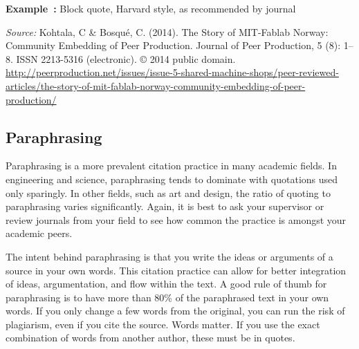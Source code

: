 \documentclass[english, 12pt, a4paper, elec, utf8, a-2b, online]{aaltothesis}
\begin{document}
\vspace{1em}
\noindent
{}
\textsf{\textbf{Example~\theexample:}} Block quote, Harvard style, as 
recommended by journal

\vspace{1ex}
{\centering
{}
}

\vspace{1ex}
\noindent
\textit{Source:} Kohtala, C \& Bosqu\'e, C. (2014). The Story of MIT-Fablab 
Norway: Community Embedding of Peer Production. Journal of Peer Production, 
5 (8): 1--8. ISSN 2213-5316 (electronic). \copyright{} 2014 public domain.  \url{http://peerproduction.net/issues/issue-5-shared-machine-shops/peer-reviewed-articles/the-story-of-mit-fablab-norway-community-embedding-of-peer-production/}


\subsection*{Paraphrasing}

Paraphrasing is a more prevalent citation practice in many academic fields. In 
engineering and science, paraphrasing tends to dominate with quotations used 
only sparingly. In other fields, such as art and design, the ratio of quoting to
paraphrasing varies significantly. Again, it is best to ask your supervisor or 
review journals from your field to see how common the practice is amongst your 
academic peers.

The intent behind paraphrasing is that you write the ideas or arguments of a 
source in your own words. This citation practice can allow for better 
integration of ideas, argumentation, and flow within the text. A good rule of 
thumb for paraphrasing is to have more than 80\% of the paraphrased text in your
own words. If you only change a few words from the original, you can run the 
risk of plagiarism, even if you cite the source. Words matter. If you use the 
exact combination of words from another author, these must be in quotes.
\end{document}
